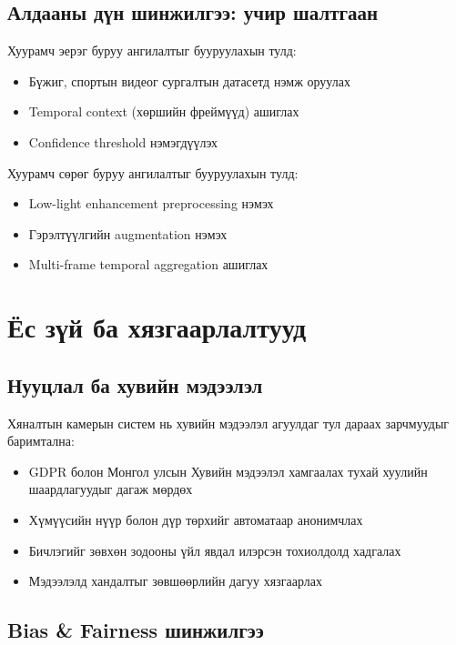 \subsection{Алдааны дүн шинжилгээ: учир шалтгаан}

Хуурамч эерэг буруу ангилалтыг бууруулахын тулд:
\begin{itemize}
    \item Бүжиг, спортын видеог сургалтын датасетд нэмж оруулах
    \item Temporal context (хөршийн фреймүүд) ашиглах
    \item Confidence threshold нэмэгдүүлэх
\end{itemize}

Хуурамч сөрөг буруу ангилалтыг бууруулахын тулд:
\begin{itemize}
    \item Low-light enhancement preprocessing нэмэх
    \item Гэрэлтүүлгийн augmentation нэмэх
    \item Multi-frame temporal aggregation ашиглах
\end{itemize}

\section{Ёс зүй ба хязгаарлалтууд}

\subsection{Нууцлал ба хувийн мэдээлэл}

Хяналтын камерын систем нь хувийн мэдээлэл агуулдаг тул дараах зарчмуудыг баримтална:

\begin{itemize}
    \item GDPR болон Монгол улсын Хувийн мэдээлэл хамгаалах тухай хуулийн шаардлагуудыг дагаж мөрдөх \cite{gdpr2016}
    \item Хүмүүсийн нүүр болон дүр төрхийг автоматаар анонимчлах
    \item Бичлэгийг зөвхөн зодооны үйл явдал илэрсэн тохиолдолд хадгалах
    \item Мэдээлэлд хандалтыг зөвшөөрлийн дагуу хязгаарлах
\end{itemize}

\subsection{Bias \& Fairness шинжилгээ}

